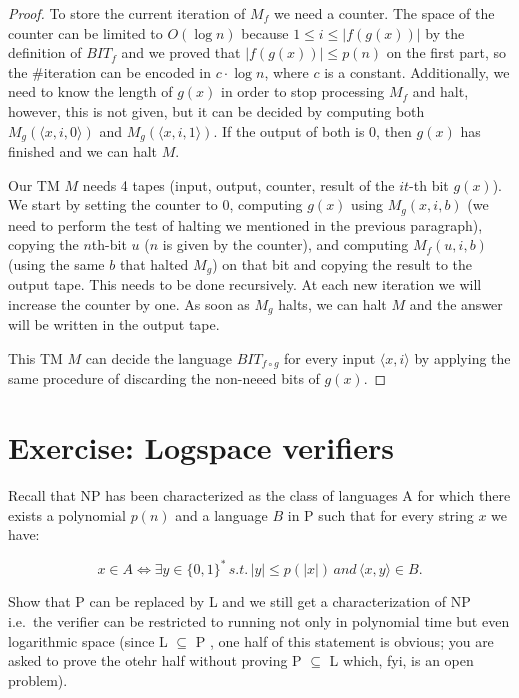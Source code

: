 \documentclass[12pt, a4paper]{article}
\begin{document}
\begin{proof}
  To store the current iteration of $M_f$ we need a counter. The space of the counter can be limited to $O(\log n)$ because $1 \leq i \leq |f(g(x))|$ by the definition of $BIT_f$ and we proved that $|f(g(x))| \leq p(n)$ on the first part, so the \#iteration can be encoded in $c \cdot \log n$, where $c$ is a constant. Additionally, we need to know the length of $g(x)$ in order to stop processing $M_f$ and halt, however, this is not given, but it can be decided by computing both $M_g(\langle x, i, 0\rangle)$ and $M_g(\langle x, i, 1\rangle)$. If the output of both is 0, then $g(x)$ has finished and we can halt $M$.


  Our TM $M$ needs 4 tapes (input, output, counter, result of the $it$-th bit $g(x)$). We start by setting the counter to 0, computing $g(x)$ using $M_g(x, i, b)$ (we need to perform the test of halting we mentioned in the previous paragraph), copying the $n$th-bit $u$ ($n$ is given by the counter), and computing $M_f(u, i, b)$ (using the same $b$ that halted $M_g$) on that bit and copying the result to the output tape. This needs to be done recursively. At each new iteration we will increase the counter by one. As soon as $M_g$ halts, we can halt $M$ and the answer will be written in the output tape.


  This TM $M$ can decide the language $BIT_{f \circ g}$ for every input $\langle x, i \rangle$ by applying the same procedure of discarding the non-neeed bits of $g(x)$.


\end{proof}

\section{Exercise: Logspace verifiers}

Recall that NP has been characterized as the class of languages A for which there exists a polynomial $p(n)$ and a language $B$ in P such that for every string $x$ we have:

\[
  x \in A \Leftrightarrow \exists y \in \{ 0 , 1 \} ^ * \, s.t. \, |y| \leq p(|x|) \, and \, \langle x, y \rangle \in B.
\]

Show that P can be replaced by L and we still get a characterization of NP\; i.e.\ the verifier can be restricted to running not only in polynomial time but even logarithmic space (since L $\subseteq$ P , one half of this statement is obvious; you are asked to prove the otehr half without proving P $\subseteq$ L which, fyi, is an open problem).
\end{document}
